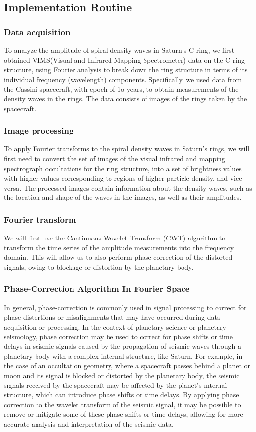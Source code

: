 \documentclass{article}
\begin{document}
\subsection{Implementation Routine}
\subsubsection{Data acquisition}
To analyze the amplitude of spiral density waves in Saturn's C ring, we first obtained VIMS(Visual and Infrared Mapping Spectrometer) data on the C-ring structure, using Fourier analysis to break down the ring structure in terms of its individual frequency (wavelength) components. Specifically, we used data from the Cassini spacecraft, with epoch of 1o years, to obtain measurements of the density waves in the rings. The data consists of images of the rings taken by the spacecraft.
\subsubsection{Image processing}
To apply Fourier transforms to the spiral density waves in Saturn's rings, we will first need to convert the set of images of the visual infrared and mapping spectrograph occultations for the ring structure, into a set of brightness values with higher values corresponding to regions of higher particle density, and vice-versa. The processed images contain information about the density waves, such as the location and shape of the waves in the images, as well as their amplitudes.
\subsubsection{Fourier transform}
We will first use the Continuous Wavelet Transform (CWT) algorithm to transform the time series of the amplitude measurements into the frequency domain. This will allow us to also perform phase correction of the distorted signals, owing to blockage or distortion by the planetary body.
\subsubsection{Phase-Correction Algorithm In Fourier Space}
In general, phase-correction is commonly used in signal processing to correct for phase distortions or misalignments that may have occurred during data acquisition or processing. In the context of planetary science or planetary seismology, phase correction may be used to correct for phase shifts or time delays in seismic signals caused by the propagation of seismic waves through a planetary body with a complex internal structure, like Saturn. For example, in the case of an occultation geometry, where a spacecraft passes behind a planet or moon and its signal is blocked or distorted by the planetary body, the seismic signals received by the spacecraft may be affected by the planet's internal structure, which can introduce phase shifts or time delays. By applying phase correction to the wavelet transform of the seismic signal, it may be possible to remove or mitigate some of these phase shifts or time delays, allowing for more accurate analysis and interpretation of the seismic data.
\end{document}
